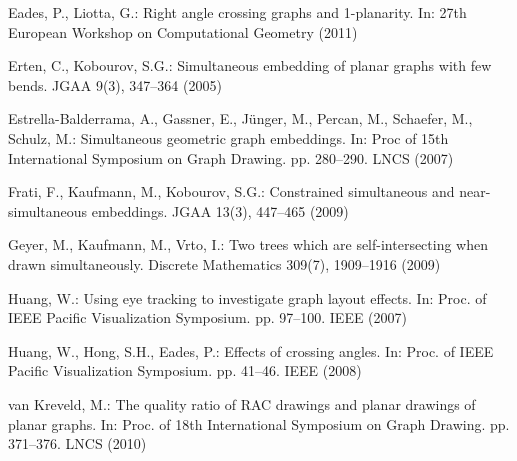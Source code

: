 \documentclass{llncs}
\begin{document}
\begin{thebibliography}{10}
Eades, P., Liotta, G.: Right angle crossing graphs and 1-planarity.
In: 27th
  European Workshop on Computational Geometry (2011)

Erten, C., Kobourov, S.G.: Simultaneous embedding of planar graphs
with few
  bends. JGAA  9(3),  347--364 (2005)

Estrella-Balderrama, A., Gassner, E., J{\"u}nger, M., Percan, M.,
Schaefer, M.,
  Schulz, M.: Simultaneous geometric graph embeddings. In: Proc of 15th
  International Symposium on Graph Drawing. pp. 280--290. LNCS (2007)

Frati, F., Kaufmann, M., Kobourov, S.G.: Constrained simultaneous
and
  near-simultaneous embeddings. JGAA  13(3),  447--465 (2009)

Geyer, M., Kaufmann, M., Vrto, I.: Two trees which are
self-intersecting when
  drawn simultaneously. Discrete Mathematics  309(7),  1909--1916 (2009)

Huang, W.: Using eye tracking to investigate graph layout effects.
In: Proc. of
  IEEE Pacific Visualization Symposium. pp. 97--100. IEEE (2007)

Huang, W., Hong, S.H., Eades, P.: Effects of crossing angles. In:
Proc. of IEEE
  Pacific Visualization Symposium. pp. 41--46. IEEE (2008)

van Kreveld, M.: The quality ratio of {RAC} drawings and planar
drawings of
  planar graphs. In: Proc. of 18th International Symposium on Graph Drawing.
  pp. 371--376. LNCS (2010)

\end{thebibliography}
\end{document}
